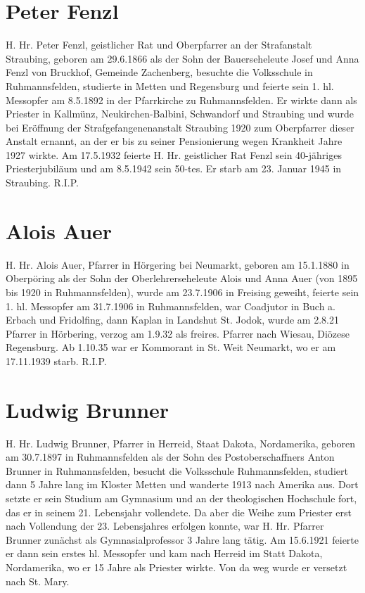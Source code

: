 \documentclass[12pt,a4paper]{book}
\begin{document}
\section{Peter Fenzl}

H. Hr. Peter Fenzl, geistlicher Rat und Oberpfarrer an der Strafanstalt
Straubing, geboren am 29.6.1866 als der Sohn der Bauerseheleute Josef und Anna
Fenzl von Bruckhof, Gemeinde Zachenberg, besuchte die Volksschule in
Ruhmannsfelden, studierte in Metten und Regensburg und feierte sein 1. hl.
Messopfer am 8.5.1892 in der Pfarrkirche zu Ruhmannsfelden. Er wirkte dann als
Priester in Kallmünz, Neukirchen-Balbini, Schwandorf und Straubing und wurde bei
Eröffnung der Strafgefangenenanstalt Straubing 1920 zum Oberpfarrer dieser
Anstalt ernannt, an der er bis zu seiner Pensionierung wegen Krankheit Jahre
1927 wirkte. Am 17.5.1932 feierte H. Hr. geistlicher Rat Fenzl sein 40-jähriges
Priesterjubiläum und am 8.5.1942 sein 50-tes. Er starb am 23. Januar 1945 in
Straubing. R.I.P.

\section{Alois Auer}

H. Hr. Alois Auer, Pfarrer in Hörgering bei Neumarkt, geboren am 15.1.1880 in
Oberpöring als der Sohn der Oberlehrerseheleute Alois und Anna Auer (von 1895
bis 1920 in Ruhmannsfelden), wurde am 23.7.1906 in Freising geweiht, feierte
sein 1. hl. Messopfer am 31.7.1906 in Ruhmannsfelden, war Coadjutor in Buch a.
Erbach und Fridolfing, dann Kaplan in Landshut St. Jodok, wurde am 2.8.21
Pfarrer in Hörbering, verzog am 1.9.32 als freires. Pfarrer nach Wiesau, Diözese
Regensburg. Ab 1.10.35 war er Kommorant in St. Weit Neumarkt, wo er am
17.11.1939 starb. R.I.P.

\section{Ludwig Brunner}

H. Hr. Ludwig Brunner, Pfarrer in Herreid, Staat Dakota, Nordamerika, geboren am
30.7.1897 in Ruhmannsfelden als der Sohn des Postoberschaffners Anton Brunner in
Ruhmannsfelden, besucht die Volksschule Ruhmannsfelden, studiert dann 5 Jahre
lang im Kloster Metten und wanderte 1913 nach Amerika aus. Dort setzte er sein
Studium am Gymnasium und an der theologischen Hochschule fort, das er in seinem
21. Lebensjahr vollendete. Da aber die Weihe zum Priester erst nach Vollendung
der 23. Lebensjahres erfolgen konnte, war H. Hr. Pfarrer Brunner zunächst als
Gymnasialprofessor 3 Jahre lang tätig. Am 15.6.1921 feierte er dann sein erstes
hl. Messopfer und kam nach Herreid im Statt Dakota, Nordamerika, wo er 15 Jahre
als Priester wirkte. Von da weg wurde er versetzt nach St. Mary.
\end{document}
